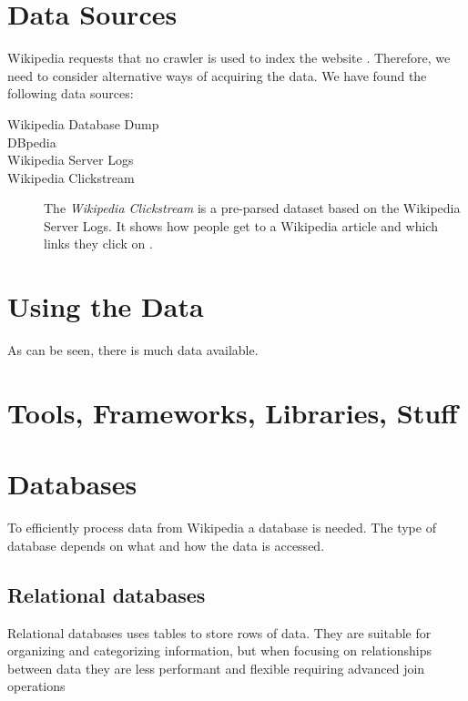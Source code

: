 \section{Data Sources}\label{sec:datasources}
Wikipedia requests that no crawler is used to index the website . Therefore, we need to consider alternative ways of acquiring the data. We have found the following data sources:
\begin{description}
  \item[Wikipedia Database Dump]
  \item[DBpedia]
  \item[Wikipedia Server Logs] 
  \item[Wikipedia Clickstream] The \emph{Wikipedia Clickstream} is a pre-parsed dataset based on the Wikipedia Server Logs. It shows how people get to a Wikipedia article and which links they click on \cite{wiki-clickstream}.
\end{description}

\section{Using the Data}

As can be seen, there is much data available. 

\section{Tools, Frameworks, Libraries, Stuff}\label{sec:selecting_tools}

\section{Databases}

To efficiently process data from Wikipedia a database is needed. The type of database depends on what and how the data is accessed.

\subsection{Relational databases}
Relational databases uses tables to store rows of data. They are suitable for organizing and categorizing information, but when focusing on relationships between data they are less performant and flexible requiring advanced join operations

